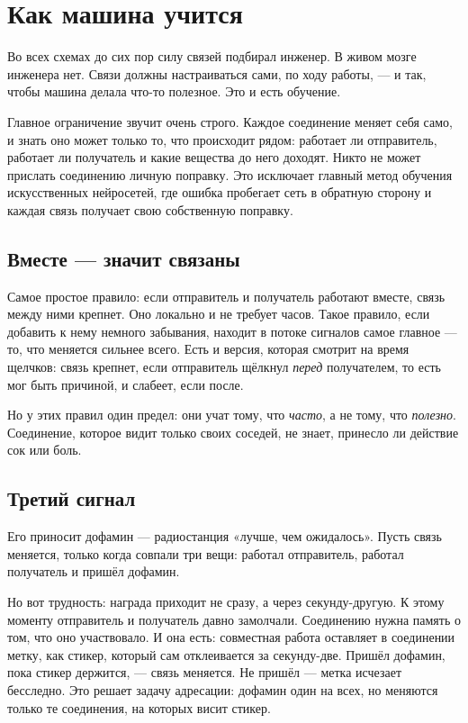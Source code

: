 \chapter{Как машина учится}

Во всех схемах до сих пор силу связей подбирал инженер. В живом мозге инженера нет. Связи должны настраиваться сами, по ходу работы, --- и так, чтобы машина делала что-то полезное. Это и есть обучение.

Главное ограничение звучит очень строго. Каждое соединение меняет себя само, и знать оно может только то, что происходит рядом: работает ли отправитель, работает ли получатель и какие вещества до него доходят. Никто не может прислать соединению личную поправку. Это исключает главный метод обучения искусственных нейросетей, где ошибка пробегает сеть в обратную сторону и каждая связь получает свою собственную поправку.

\section*{Вместе --- значит связаны}

Самое простое правило: если отправитель и получатель работают вместе, связь между ними крепнет. Оно локально и не требует часов. Такое правило, если добавить к нему немного забывания, находит в потоке сигналов самое главное --- то, что меняется сильнее всего. Есть и версия, которая смотрит на время щелчков: связь крепнет, если отправитель щёлкнул \emph{перед} получателем, то есть мог быть причиной, и слабеет, если после.

Но у этих правил один предел: они учат тому, что \emph{часто}, а не тому, что \emph{полезно}. Соединение, которое видит только своих соседей, не знает, принесло ли действие сок или боль.

\section*{Третий сигнал}

Его приносит дофамин --- радиостанция «лучше, чем ожидалось». Пусть связь меняется, только когда совпали три вещи: работал отправитель, работал получатель и пришёл дофамин.


Но вот трудность: награда приходит не сразу, а через секунду-другую. К этому моменту отправитель и получатель давно замолчали. Соединению нужна память о том, что оно участвовало. И она есть: совместная работа оставляет в соединении метку, как стикер, который сам отклеивается за секунду-две. Пришёл дофамин, пока стикер держится, --- связь меняется. Не пришёл --- метка исчезает бесследно. Это решает задачу адресации: дофамин один на всех, но меняются только те соединения, на которых висит стикер.

